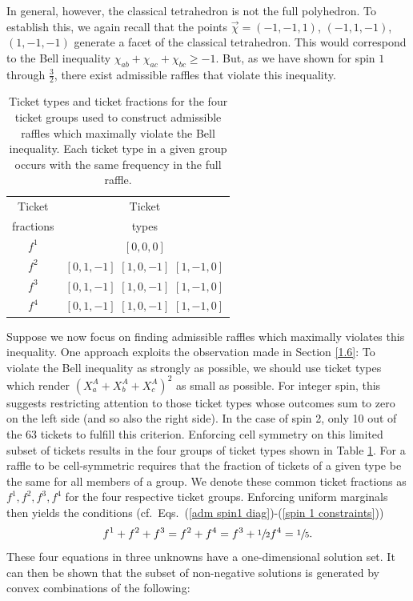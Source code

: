 In general, however, the classical tetrahedron is not the full polyhedron. To establish this, we again recall that the points $\vec{\chi}=(-1,-1,1)$, $(-1,1,-1)$, $(1,-1,-1)$ generate a facet of the classical tetrahedron. This would correspond to the Bell inequality $\chi_{ab}+\chi_{ac}+\chi_{bc}\geq -1$. But, as we have shown for spin $1$ through $\frac32$, there exist admissible raffles that violate this inequality. 
\begin{table}[h]
\centering
\begin{tabular}{|c|c|}
\hline
Ticket  & Ticket \\
fractions & types \\[.1cm]
\hline
$f^1$ & $[0,0,0]$ \\[.2cm]
$f^2$ & $[0,1,-1]$ $[1,0,-1]$ $[1,-1,0]$ \\[.2cm]
$f^3$ & $[0,1,-1]$ $[1,0,-1]$ $[1,-1,0]$ \\[.2cm]
$f^4$ & $[0,1,-1]$ $[1,0,-1]$ $[1,-1,0]$ \\[.2cm]
\hline
\end{tabular}
\caption{Ticket types and ticket fractions for the four ticket groups used to construct admissible raffles which maximally violate the Bell inequality. Each ticket type in a given group occurs with the same frequency in the full raffle.}
\label{Spin2TicketGroups}
\end{table} 

Suppose we now focus on finding admissible raffles which maximally violates this inequality. One approach exploits the observation made in Section \ref{1.6}: To violate the Bell inequality as strongly as possible, we should use ticket types which render $(X_a^A+X_b^A+X_c^A)^2$ as small as possible. For integer spin, this suggests restricting attention to those ticket types whose outcomes sum to zero on the left side (and so also the right side). In the case of spin 2, only 10 out of the 63 tickets to fulfill this criterion. Enforcing cell symmetry on this limited subset of tickets results in the four groups of ticket types shown in Table \ref{Spin2TicketGroups}. For a raffle to be cell-symmetric requires that the fraction of tickets of a given type be the same for all members of a group. We denote these common ticket fractions as $f^1,f^2,f^3,f^4$ for the four respective ticket groups. Enforcing uniform marginals then yields the conditions (cf.\ Eqs.\ (\ref{adm spin1 diag})-(\ref{spin 1 constraints})) 
$$f^1+f^2+f^3=f^2+f^4=f^3+\sfrac12 f^4=\sfrac15.$$ These four equations in three unknowns have a one-dimensional solution set. It can then be shown that the subset of non-negative solutions is generated by convex combinations of the following:

